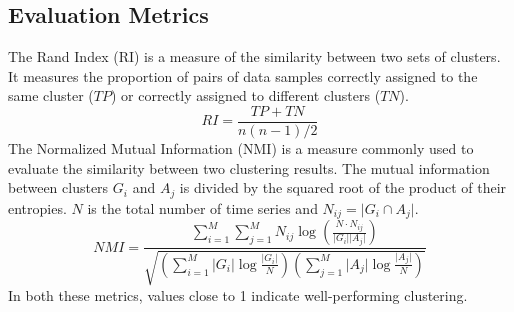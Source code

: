 \documentclass[times, review, 10pt]{elsarticle}
\begin{document}
\subsection{Evaluation Metrics}
The Rand Index (RI) is a measure of the similarity between two sets of clusters. It measures the proportion of pairs of data samples correctly assigned to the same cluster ($TP$) or correctly assigned to different clusters ($TN$).
%
\begin{equation}
    RI = \frac{TP+TN}{n(n-1)/2}
\end{equation}
%
The Normalized Mutual Information (NMI) is a measure commonly used to evaluate the similarity between two clustering results. The mutual information between clusters $G_i$ and $A_j$ is divided by the squared root of the product of their entropies. $N$ is the total number of time series and $N_{ij} = \lvert G_i \cap A_j \rvert$.
%
\begin{equation}
    NMI = \frac{\sum_{i=1}^M \sum_{j=1}^M N_{ij} \log{(\frac{N \cdot N_{ij}}{\lvert G_i \rvert \lvert A_j \rvert})}}{\sqrt{(\sum_{i=1}^M \lvert G_i \rvert \log{\frac{\lvert G_i \rvert}{N}})(\sum_{j=1}^M \lvert A_j \rvert \log{\frac{\lvert A_j \rvert}{N}})}}
\end{equation}
%
In both these metrics, values close to 1 indicate well-performing clustering.
\end{document}

